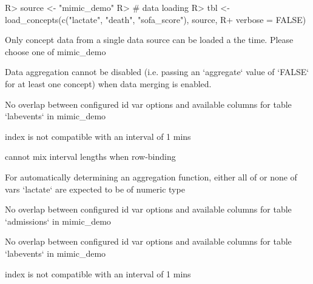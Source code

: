 \documentclass[
]{jss}
\begin{document}
\begin{CodeChunk}

\begin{CodeInput}
R> source <- "mimic_demo"
R> # data loading
R> tbl <- load_concepts(c("lactate", "death", "sofa_score"), source,
R+                      verbose = FALSE)
\end{CodeInput}

\begin{CodeOutput}
Only concept data from a single data source can be loaded a the time. Please
choose one of mimic_demo
\end{CodeOutput}

\begin{CodeOutput}
Data aggregation cannot be disabled (i.e. passing an `aggregate` value of
`FALSE` for at least one concept) when data merging is enabled.
\end{CodeOutput}

\begin{CodeOutput}
No overlap between configured id var options and available columns for table
`labevents` in mimic_demo
\end{CodeOutput}

\begin{CodeOutput}
index is not compatible with an interval of 1 mins
\end{CodeOutput}

\begin{CodeOutput}
cannot mix interval lengths when row-binding
\end{CodeOutput}

\begin{CodeOutput}
For automatically determining an aggregation function, either all of or none of
vars `lactate` are expected to be of numeric type
\end{CodeOutput}

\begin{CodeOutput}
No overlap between configured id var options and available columns for table
`admissions` in mimic_demo
\end{CodeOutput}

\begin{CodeOutput}
No overlap between configured id var options and available columns for table
`labevents` in mimic_demo
\end{CodeOutput}

\begin{CodeOutput}
index is not compatible with an interval of 1 mins
\end{CodeOutput}


\end{CodeChunk}
\end{document}
